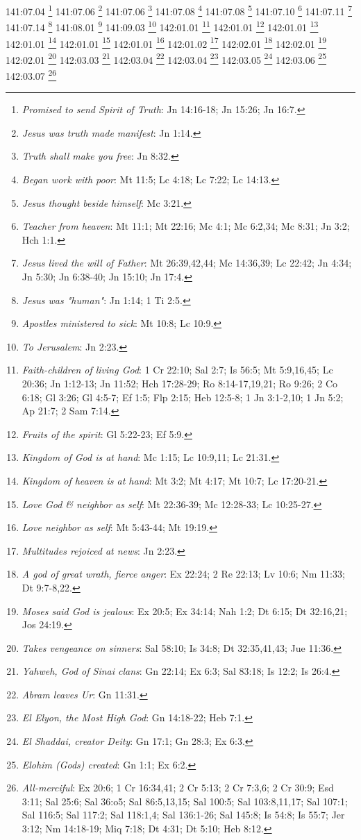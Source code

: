 141:07.04 \footnote{\textit{Promised to send Spirit of Truth}: Jn 14:16-18; Jn 15:26; Jn 16:7.}
141:07.06 \footnote{\textit{Jesus was truth made manifest}: Jn 1:14.}
141:07.06 \footnote{\textit{Truth shall make you free}: Jn 8:32.}
141:07.08 \footnote{\textit{Began work with poor}: Mt 11:5; Lc 4:18; Lc 7:22; Lc 14:13.}
141:07.08 \footnote{\textit{Jesus thought beside himself}: Mc 3:21.}
141:07.10 \footnote{\textit{Teacher from heaven}: Mt 11:1; Mt 22:16; Mc 4:1; Mc 6:2,34; Mc 8:31; Jn 3:2; Hch 1:1.}
141:07.11 \footnote{\textit{Jesus lived the will of Father}: Mt 26:39,42,44; Mc 14:36,39; Lc 22:42; Jn 4:34; Jn 5:30; Jn 6:38-40; Jn 15:10; Jn 17:4.}
141:07.14 \footnote{\textit{Jesus was "human"}: Jn 1:14; 1 Ti 2:5.}
141:08.01 \footnote{\textit{Apostles ministered to sick}: Mt 10:8; Lc 10:9.}
141:09.03 \footnote{\textit{To Jerusalem}: Jn 2:23.}
142:01.01 \footnote{\textit{Faith-children of living God}: 1 Cr 22:10; Sal 2:7; Is 56:5; Mt 5:9,16,45; Lc 20:36; Jn 1:12-13; Jn 11:52; Hch 17:28-29; Ro 8:14-17,19,21; Ro 9:26; 2 Co 6:18; Gl 3:26; Gl 4:5-7; Ef 1:5; Flp 2:15; Heb 12:5-8; 1 Jn 3:1-2,10; 1 Jn 5:2; Ap 21:7; 2 Sam 7:14.}
142:01.01 \footnote{\textit{Fruits of the spirit}: Gl 5:22-23; Ef 5:9.}
142:01.01 \footnote{\textit{Kingdom of God is at hand}: Mc 1:15; Lc 10:9,11; Lc 21:31.}
142:01.01 \footnote{\textit{Kingdom of heaven is at hand}: Mt 3:2; Mt 4:17; Mt 10:7; Lc 17:20-21.}
142:01.01 \footnote{\textit{Love God & neighbor as self}: Mt 22:36-39; Mc 12:28-33; Lc 10:25-27.}
142:01.01 \footnote{\textit{Love neighbor as self}: Mt 5:43-44; Mt 19:19.}
142:01.02 \footnote{\textit{Multitudes rejoiced at news}: Jn 2:23.}
142:02.01 \footnote{\textit{A god of great wrath, fierce anger}: Ex 22:24; 2 Re 22:13; Lv 10:6; Nm 11:33; Dt 9:7-8,22.}
142:02.01 \footnote{\textit{Moses said God is jealous}: Ex 20:5; Ex 34:14; Nah 1:2; Dt 6:15; Dt 32:16,21; Jos 24:19.}
142:02.01 \footnote{\textit{Takes vengeance on sinners}: Sal 58:10; Is 34:8; Dt 32:35,41,43; Jue 11:36.}
142:03.03 \footnote{\textit{Yahweh, God of Sinai clans}: Gn 22:14; Ex 6:3; Sal 83:18; Is 12:2; Is 26:4.}
142:03.04 \footnote{\textit{Abram leaves Ur}: Gn 11:31.}
142:03.04 \footnote{\textit{El Elyon, the Most High God}: Gn 14:18-22; Heb 7:1.}
142:03.05 \footnote{\textit{El Shaddai, creator Deity}: Gn 17:1; Gn 28:3; Ex 6:3.}
142:03.06 \footnote{\textit{Elohim (Gods) created}: Gn 1:1; Ex 6:2.}
142:03.07 \footnote{\textit{All-merciful}: Ex 20:6; 1 Cr 16:34,41; 2 Cr 5:13; 2 Cr 7:3,6; 2 Cr 30:9; Esd 3:11; Sal 25:6; Sal 36:o5; Sal 86:5,13,15; Sal 100:5; Sal 103:8,11,17; Sal 107:1; Sal 116:5; Sal 117:2; Sal 118:1,4; Sal 136:1-26; Sal 145:8; Is 54:8; Is 55:7; Jer 3:12; Nm 14:18-19; Miq 7:18; Dt 4:31; Dt 5:10; Heb 8:12.}
